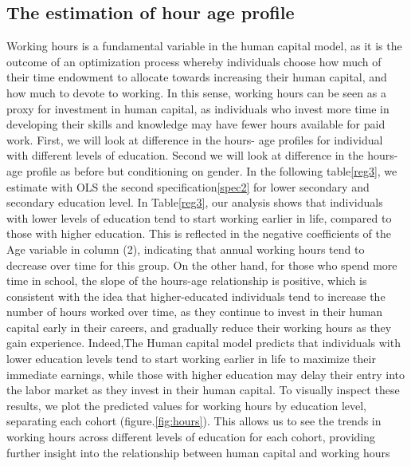 \documentclass[12pt]{article}
\begin{document}
\subsection{The estimation of hour age profile}
Working hours is a fundamental variable in the human capital model, as it is the outcome of an optimization process
whereby individuals choose how much of their time endowment to allocate towards increasing their human capital, and how
much to devote to working. In this sense, working hours can be seen as a proxy for investment in human capital, as
individuals who invest more time in developing their skills and knowledge may have fewer hours available for paid
work.\newline
First, we will look at difference in the hours- age profiles for individual with different levels of education. Second we
will look at difference in the hours-age profile as before but conditioning on gender. In the following table\ref{reg3}, we estimate with OLS the second specification\ref{spec2} for lower secondary and secondary education level.
\newline
In Table\ref{reg3}, our analysis shows that individuals with lower levels of education tend to start working earlier in life, compared to those with higher education. This is reflected in the negative coefficients of the Age variable in column (2), indicating that annual working hours tend to decrease over time for this group. 
\newline
On the other hand, for those who spend more time in school, the slope of the hours-age relationship is positive, which is consistent with the idea that higher-educated individuals tend to increase the number of hours worked over time, as they continue to invest in their human capital early in their careers, and gradually reduce their working hours as they gain experience. 
Indeed,The Human capital model predicts that individuals with lower education levels tend to start working earlier in life to maximize their immediate earnings, while those with higher education may delay their entry into the labor market as they invest in their human capital.
\newline
To visually inspect these results, we plot the predicted values for working hours by education level, separating each
cohort (figure.\ref{fig:hours}). This allows us to see the trends in working hours across different levels of education for each cohort,
providing further insight into the relationship between human capital and working hours
\newline
\end{document}

